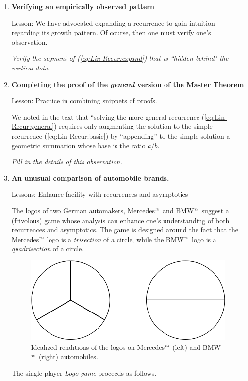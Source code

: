 \begin{enumerate}
\item
{\bf Verifying an empirically observed pattern}

{\sc Lesson:} We have advocated expanding a recurrence to gain intuition regarding its growth pattern.  Of course, then one must verify one's observation.

\smallskip

{\em Verify the segment of (\ref{eq:Lin-Recur:expand}) that is ``hidden behind" the vertical dots.} 
\medskip

\item
{\bf Completing the proof of the {\em general} version of the Master Theorem}

{\sc Lesson:} Practice in combining snippets of proofs.

\smallskip

We noted in the text that ``solving the more general recurrence (\ref{eq:Lin-Recur:general}) requires only augmenting the solution to the simple recurrence (\ref{eq:Lin-Recur:basic}) by ``appending'' to the simple solution a geometric summation whose base is the ratio $a/b$.

{\em Fill in the details of this observation.}
\medskip

\item
{\bf An unusual comparison of automobile brands.}

{\sc Lessons:} Enhance facility with recurrences and asymptotics

\smallskip

The logos of two German automakers, {\sc Mercedes}$^{\mbox{\tiny\sc tm}}$ and BMW$^{\mbox{\tiny\sc tm}}$ suggest a (frivolous) game whose analysis can enhance one's understanding of both recurrences and asymptotics.  The game is designed around the fact that the {\sc Mercedes}$^{\mbox{\tiny\sc tm}}$ logo is a {\em trisection} of a circle, while the BMW$^{\mbox{\tiny\sc tm}}$ logo is a {\em quadrisection} of a circle.  
\begin{figure}[htb]
\begin{center}
        \includegraphics[scale=0.3]{FiguresMaths/AutomotiveBrands.png}
\end{center}
\caption{Idealized renditions of the logos on {\sc Mercedes}$^{\mbox{\tiny\sc tm}}$ (left) and BMW$^{\mbox{\tiny\sc tm}}$ (right) automobiles.}
\label{fig:auto-logos}
\end{figure}
The single-player {\it Logo game} proceeds as follows.  


\end{enumerate}
